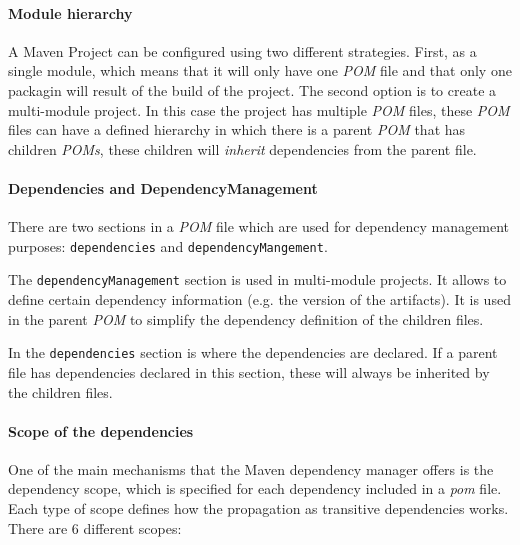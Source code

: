 \paragraph{Module hierarchy}
A Maven Project can be configured using two different strategies. First, as a single module, which means that it will only have one \textit{POM} file and that only one packagin will result of the build of the project. The second option is to create a multi-module project. In this case the project has multiple \textit{POM} files, these \textit{POM} files can have a defined hierarchy in which there is a parent \textit{POM} that has children \textit{POMs}, these children will \textit{inherit} dependencies from the parent file.

\paragraph{Dependencies and DependencyManagement}
There are two sections in a \textit{POM} file which are used for dependency management purposes: \texttt{dependencies} and \texttt{dependencyMangement}.

The \texttt{dependencyManagement} section is used in multi-module projects. It allows to define certain dependency information (e.g. the version of the artifacts). It is used in the parent \textit{POM} to simplify the dependency definition of the children files.

In the \texttt{dependencies} section is where the dependencies are declared. If a parent file has dependencies declared in this section, these will always be inherited by the children files.

\paragraph{Scope of the dependencies}
One of the main mechanisms that the Maven dependency manager offers is the dependency scope, which is specified for each dependency included in a \textit{pom} file. Each type of scope defines how the propagation as transitive dependencies works. There are 6 different scopes:

